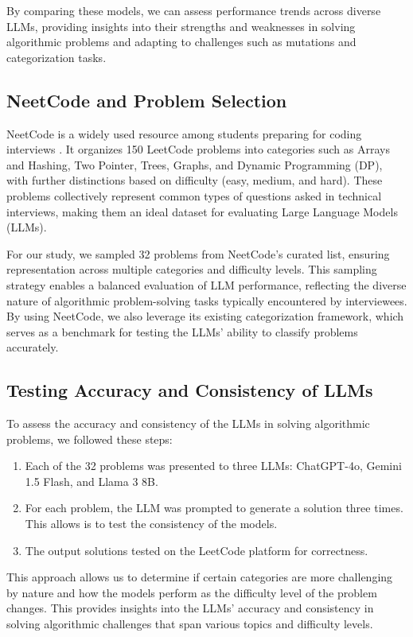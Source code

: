 \documentclass[times, 10pt,twocolumn]{article}
\begin{document}
By comparing these models, we can assess performance trends across diverse LLMs, providing insights into their strengths and weaknesses in solving algorithmic problems and adapting to challenges such as mutations and categorization tasks.

\subsection{NeetCode and Problem Selection}
NeetCode is a widely used resource among students preparing for coding interviews \cite{neetcode}. It organizes 150 LeetCode problems into categories such as Arrays and Hashing, Two Pointer, Trees, Graphs, and Dynamic Programming (DP), with further distinctions based on difficulty (easy, medium, and hard). These problems collectively represent common types of questions asked in technical interviews, making them an ideal dataset for evaluating Large Language Models (LLMs).

For our study, we sampled 32 problems from NeetCode's curated list, ensuring representation across multiple categories and difficulty levels. This sampling strategy enables a balanced evaluation of LLM performance, reflecting the diverse nature of algorithmic problem-solving tasks typically encountered by interviewees. By using NeetCode, we also leverage its existing categorization framework, which serves as a benchmark for testing the LLMs' ability to classify problems accurately.

\subsection{Testing Accuracy and Consistency of LLMs}
To assess the accuracy and consistency of the LLMs in solving algorithmic problems, we followed these steps:

\begin{enumerate}
    \item Each of the 32 problems was presented to three LLMs: ChatGPT-4o, Gemini 1.5 Flash, and Llama 3 8B.
    \item For each problem, the LLM was prompted to generate a solution three times. This allows is to test the consistency of the models.
    \item The output solutions tested on the LeetCode platform for correctness.
\end{enumerate}

This approach allows us to determine if certain categories are more challenging by nature and how the models perform as the difficulty level of the problem changes. This provides insights into the LLMs' accuracy and consistency in solving algorithmic challenges that span various topics and difficulty levels.
\end{document}
